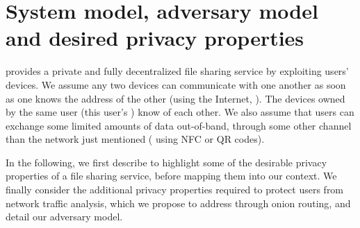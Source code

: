 

\section{System model, adversary model and desired privacy properties}%
\label{system-model}

\name provides a private and fully decentralized file sharing service by exploiting 
users' devices. 
We assume any two devices can communicate with one another as soon as one knows the address of the other (\eg using the Internet, ). The devices owned by the same user (this user's \squad) know of each other.
We also assume that users can exchange some limited amounts of data 
out-of-band, \ie through some other channel than the network just mentioned (\eg 
using \ac{NFC} or QR codes).




In the following, we first describe 
to
highlight some of the desirable privacy properties of a file sharing service, before mapping them into our 
context. 
We finally consider the additional privacy properties required to protect users from  network traffic analysis, which we propose to address through onion
routing, and detail our adversary model.  

